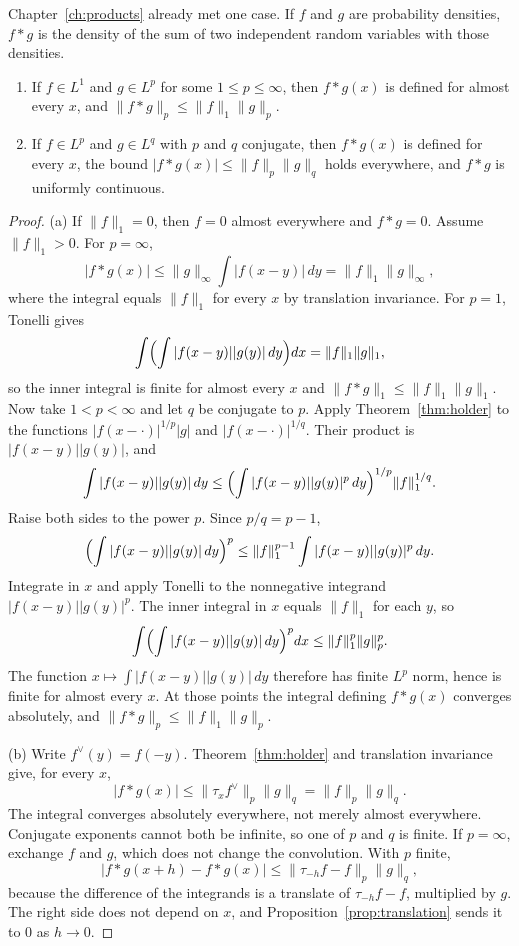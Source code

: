 Chapter~\ref{ch:products} already met one case. If $f$ and $g$ are probability densities, $f*g$ is the density of the sum of two independent random variables with those densities.

\begin{proposition}\label{prop:convolution}
\begin{enumerate}[label=(\alph*)]
\item If $f\in L^1$ and $g\in L^p$ for some $1\le p\le\infty$, then $f*g(x)$ is defined for almost every $x$, and $\|f*g\|_p\le\|f\|_1\|g\|_p$.
\item If $f\in L^p$ and $g\in L^q$ with $p$ and $q$ conjugate, then $f*g(x)$ is defined for every $x$, the bound $|f*g(x)|\le\|f\|_p\|g\|_q$ holds everywhere, and $f*g$ is uniformly continuous.
\end{enumerate}
\end{proposition}
\begin{proof}
(a) If $\|f\|_1=0$, then $f=0$ almost everywhere and $f*g=0$. Assume $\|f\|_1>0$. For $p=\infty$,
\[|f*g(x)|\le\|g\|_\infty\int|f(x-y)|\,dy=\|f\|_1\|g\|_\infty,\]
where the integral equals $\|f\|_1$ for every $x$ by translation invariance. For $p=1$, Tonelli gives
\[\int\Bigl(\int|f(x-y)||g(y)|\,dy\Bigr)dx=\|f\|_1\|g\|_1,\]
so the inner integral is finite for almost every $x$ and $\|f*g\|_1\le\|f\|_1\|g\|_1$. Now take $1<p<\infty$ and let $q$ be conjugate to $p$. Apply Theorem~\ref{thm:holder} to the functions $|f(x-\cdot)|^{1/p}|g|$ and $|f(x-\cdot)|^{1/q}$. Their product is $|f(x-y)||g(y)|$, and
\[\int|f(x-y)||g(y)|\,dy\le\Bigl(\int|f(x-y)||g(y)|^p\,dy\Bigr)^{1/p}\|f\|_1^{1/q}.\]
Raise both sides to the power $p$. Since $p/q=p-1$,
\[\Bigl(\int|f(x-y)||g(y)|\,dy\Bigr)^p\le\|f\|_1^{p-1}\int|f(x-y)||g(y)|^p\,dy.\]
Integrate in $x$ and apply Tonelli to the nonnegative integrand $|f(x-y)||g(y)|^p$. The inner integral in $x$ equals $\|f\|_1$ for each $y$, so
\[\int\Bigl(\int|f(x-y)||g(y)|\,dy\Bigr)^p dx\le\|f\|_1^p\|g\|_p^p.\]
The function $x\mapsto\int|f(x-y)||g(y)|\,dy$ therefore has finite $L^p$ norm, hence is finite for almost every $x$. At those points the integral defining $f*g(x)$ converges absolutely, and $\|f*g\|_p\le\|f\|_1\|g\|_p$.

(b) Write $f^\vee(y)=f(-y)$. Theorem~\ref{thm:holder} and translation invariance give, for every $x$,
\[|f*g(x)|\le\|\tau_x f^\vee\|_p\|g\|_q=\|f\|_p\|g\|_q.\]
The integral converges absolutely everywhere, not merely almost everywhere. Conjugate exponents cannot both be infinite, so one of $p$ and $q$ is finite. If $p=\infty$, exchange $f$ and $g$, which does not change the convolution. With $p$ finite,
\[|f*g(x+h)-f*g(x)|\le\|\tau_{-h}f-f\|_p\|g\|_q,\]
because the difference of the integrands is a translate of $\tau_{-h}f-f$, multiplied by $g$. The right side does not depend on $x$, and Proposition~\ref{prop:translation} sends it to $0$ as $h\to0$.
\end{proof}

